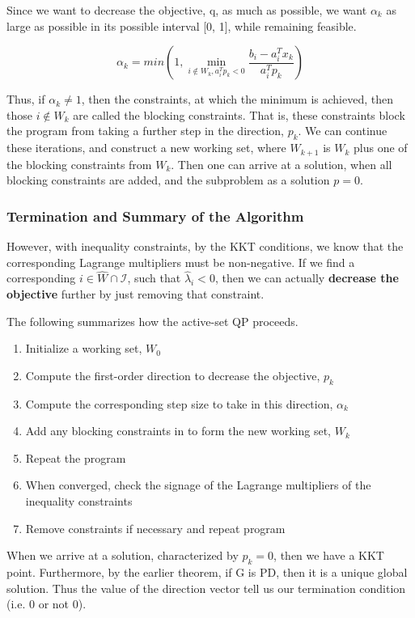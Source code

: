 \documentclass[class=article, crop=false]{standalone}
\begin{document}
			Since we want to decrease the objective, q, as much as possible, we want $\alpha_k$ as large as possible in its possible interval [0, 1], while remaining feasible. 

				$$\alpha_k = min(1, \min_{i \notin W_k, a_i^T p_k < 0} \frac{b_i - a_i^T x_k}{a_i^T p_k})$$

			Thus, if $\alpha_k \neq 1$, then the constraints, at which the minimum is achieved, then those $i \notin W_k$ are called the blocking constraints. That is, these constraints block the program from taking a further step in the direction, $p_k$. We can continue these iterations, and construct a new working set, where $W_{k+1}$ is $W_k$ plus one of the blocking constraints from $W_k$. Then one can arrive at a solution, when all blocking constraints are added, and the subproblem as a solution $p = 0$.

		\subsubsection{Termination and Summary of the Algorithm}
			However, with inequality constraints, by the KKT conditions, we know that the corresponding Lagrange multipliers must be non-negative. If we find a corresponding $i \in \hat{W} \cap \mathcal{I}$, such that $\hat{\lambda}_i < 0$, then we can actually \textbf{decrease the objective} further by just removing that constraint.

			The following summarizes how the active-set QP proceeds.

			\begin{enumerate}
				\item Initialize a working set, $W_0$
				\item Compute the first-order direction to decrease the objective, $p_k$
				\item Compute the corresponding step size to take in this direction, $\alpha_k$
				\item Add any blocking constraints in to form the new working set, $W_k$
				\item Repeat the program
				\item When converged, check the signage of the Lagrange multipliers of the inequality constraints
				\item Remove constraints if necessary and repeat program
			\end{enumerate}

			When we arrive at a solution, characterized by $p_k = 0$, then we have a KKT point. Furthermore, by the earlier theorem, if G is PD, then it is a unique global solution. Thus the value of the direction vector tell us our termination condition (i.e. 0 or not 0).
\end{document}
